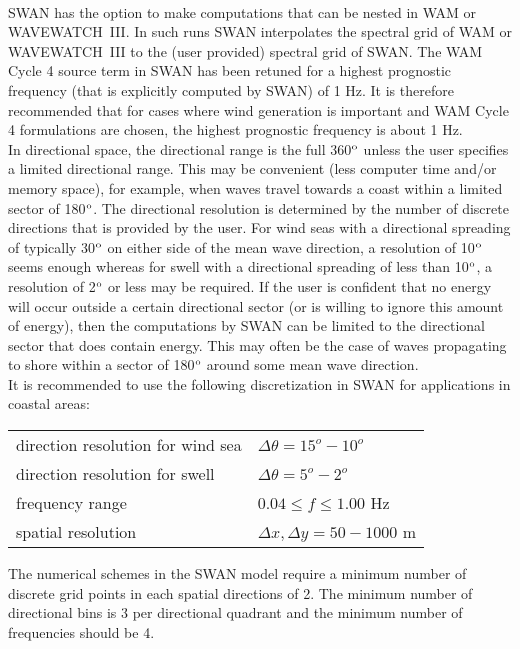 \documentclass[12pt]{book}
\begin{document}
\\[2ex]
\noindent
SWAN has the option to make computations that can be nested in WAM or WAVEWATCH~III. In such runs
SWAN interpolates the spectral grid of WAM or WAVEWATCH~III to the (user provided) spectral grid of
SWAN. The WAM Cycle 4 source term in SWAN has been retuned for a highest prognostic frequency (that
is explicitly computed by SWAN) of 1 Hz. It is therefore recommended that for cases where wind
generation is important and WAM Cycle 4 formulations are chosen, the highest prognostic frequency is
about 1 Hz.
\\[2ex]
\noindent
In directional space, the directional range is the full 360$^{{\rm o}}$ unless the user specifies a
limited directional range. This may be convenient (less computer time and/or memory space), for example,
when waves travel towards a coast within a limited sector of 180$^{{\rm o}}$. The directional resolution
is determined by the number of discrete directions that is provided by the user. For wind seas with a
directional spreading of typically 30$^{{\rm o}}$ on either side of the mean wave direction, a resolution
of 10$^{{\rm o}}$ seems enough whereas for swell with a directional spreading of less than 10$^{{\rm o}}$,
a resolution of 2$^{{\rm o}}$ or less may be required. If the user is confident that no energy will occur
outside a certain directional sector (or is willing to ignore this amount of energy), then the computations
by SWAN can be limited to the directional sector that does contain energy. This may often be the case of
waves propagating to shore within a sector of 180$^{{\rm o}}$ around some mean wave direction.
\\[2ex]
\noindent
It is recommended to use the following discretization in SWAN for applications in coastal areas:
\begin{table}[htb]
\begin{tabular}{l l}
\hline
   direction resolution for wind sea & $\Delta \theta = 15^o - 10^o$ \\
   direction resolution for swell    & $\Delta \theta = 5^o - 2^o$ \\
   frequency range                   & $0.04 \leq f \leq 1.00$ Hz \\
   spatial resolution                & $\Delta x, \Delta y = 50 - 1000$ m\\
\hline
\end{tabular}
\end{table}

\noindent
The numerical schemes in the SWAN model require a minimum number of discrete grid points in each
spatial directions of 2. The minimum number of directional bins is 3 per directional quadrant and
the minimum number of frequencies should be 4.
\end{document}
